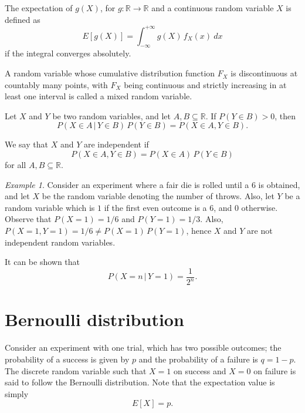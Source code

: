 \documentclass[11pt]{article}
\def\R{\mathbb{R}}
\newcommand\E[1]{E[#1]}
\theoremstyle{definition}
\theoremstyle{remark}
\newtheorem*{example}{Example}
\numberwithin{equation}{module}
\begin{document}
    \begin{definition}[Expectation]
        The expectation of $g(X)$, for $g\colon \R \to \R$ and a continuous random
        variable $X$ is defined as \[
            \E{g(X)} = \int_{-\infty}^{+\infty} g(X)\, f_X(x)\:dx
        \] if the integral converges absolutely.
    \end{definition}


    \begin{definition}
        A random variable whose cumulative distribution function $F_X$ is
        discontinuous at countably many points, with $F_X$ being continuous and
        strictly increasing in at least one interval is called a mixed random
        variable.
    \end{definition}

    \begin{definition}
        Let $X$ and $Y$ be two random variables, and let $A, B \subseteq \R$.
        If $P(Y \in B) > 0$, then \[
            P(X \in A \,|\, Y\in B)\, P(Y \in B) = P(X \in A, Y \in B).
        \] 
    \end{definition}
    \begin{definition}
        We say that $X$ and $Y$ are independent if \[
            P(X \in A, Y \in B) = P(X \in A)\, P(Y \in B)
        \] for all $A, B \subseteq \R$.
    \end{definition}

    \begin{example}
        Consider an experiment where a fair die is rolled until a 6 is obtained, and
        let $X$ be the random variable denoting the number of throws.  Also, let $Y$
        be a random variable which is $1$ if the first even outcome is a 6, and 0
        otherwise. Observe that $P(X = 1) = 1 / 6$ and $P(Y = 1) = 1 / 3$. Also,
        $P(X = 1, Y = 1) = 1 / 6 \neq P(X = 1)\, P(Y = 1)$, hence $X$ and $Y$ are
        not independent random variables.

        It can be shown that \[
            P(X = n \,|\, Y = 1) = \frac{1}{2^n}.
        \] 
    \end{example}

    \section*{Bernoulli distribution}
    Consider an experiment with one trial, which has two possible outcomes; the
    probability of a success is given by $p$ and the probability of a failure is $q
    = 1 - p$. The discrete random variable such that $X = 1$ on success and $X = 0$
    on failure is said to follow the Bernoulli distribution. Note that the
    expectation value is simply \[
        \E{X} = p.
    \] 
\end{document}

